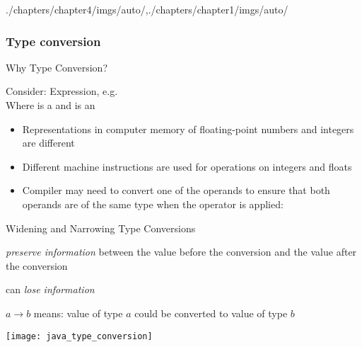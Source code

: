 \begin{graphicspathcontext}{{./chapters/chapter4/imgs/auto/},{./chapters/chapter1/imgs/auto/}}
\begin{bibunit}[apalike]
\subsubsection{Type conversion}
\subsubsectiontableofcontentslide

\begin{frame}[t]{Why Type Conversion?}
	\begin{block}{Consider:}
		Expression, e.g.  \\
		Where  is a  and  is an 
	\end{block}
	\vspace{.25cm}
	\begin{itemize}
	\item Representations in computer memory of floating-point numbers and integers are different
	\item Different machine instructions are used for operations on integers and floats
	\item Compiler may need to convert one of the operands to ensure that both operands are of the same type when the operator is applied:
			\begin{tac}[.5\linewidth]
			\end{tac}
	\end{itemize}
	\vspace{.5cm}
\end{frame}

\begin{frame}[t]{{Widening and Narrowing} Type Conversions}
	\begin{description}
	\item[Widening conversion] \emph{preserve information} between the value before the conversion and the value after the conversion
	\item[Narrowing conversion] can \emph{lose information}
	\item $a \rightarrow b$ means: value of type $a$ could be converted to value of type $b$
	\end{description}
	\begin{center}
		\texttt{[image: java\_type\_conversion]}
	\end{center}
\end{frame}


\end{bibunit}
\end{graphicspathcontext}
